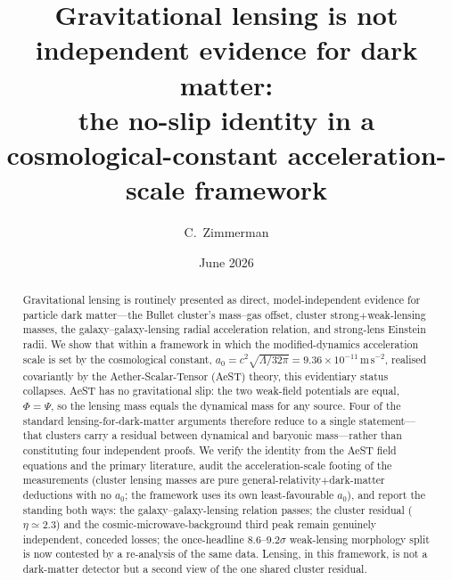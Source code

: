 \documentclass[aps,prd,twocolumn,10pt,nofootinbib,superscriptaddress]{revtex4-2}
\begin{document}
\title{Gravitational lensing is not independent evidence for dark matter:\\
the no-slip identity in a cosmological-constant acceleration-scale framework}
\author{C.\ Zimmerman}
\date{June 2026}

\begin{abstract}
Gravitational lensing is routinely presented as direct, model-independent evidence for particle dark matter---the
Bullet cluster's mass--gas offset, cluster strong$+$weak-lensing masses, the galaxy--galaxy-lensing radial
acceleration relation, and strong-lens Einstein radii. We show that within a framework in which the modified-dynamics
acceleration scale is set by the cosmological constant, $a_0=c^2\sqrt{\Lambda/32\pi}=9.36\times10^{-11}\,\mathrm{m\,
s^{-2}}$, realised covariantly by the Aether-Scalar-Tensor (AeST) theory, this evidentiary status collapses. AeST has
no gravitational slip: the two weak-field potentials are equal, $\Phi=\Psi$, so the lensing mass equals the dynamical
mass for any source. Four of the standard lensing-for-dark-matter arguments therefore reduce to a single statement---
that clusters carry a residual between dynamical and baryonic mass---rather than constituting four independent proofs.
We verify the identity from the AeST field equations and the primary literature, audit the acceleration-scale footing
of the measurements (cluster lensing masses are pure general-relativity$+$dark-matter deductions with no $a_0$; the
framework uses its own least-favourable $a_0$), and report the standing both ways: the galaxy--galaxy-lensing relation
passes; the cluster residual ($\eta\!\simeq\!2.3$) and the cosmic-microwave-background third peak remain genuinely
independent, conceded losses; the once-headline $8.6$--$9.2\sigma$ weak-lensing morphology split is now contested by
a re-analysis of the same data. Lensing, in this framework, is not a dark-matter detector but a second view of the
one shared cluster residual.
\end{abstract}

\maketitle
\end{document}
